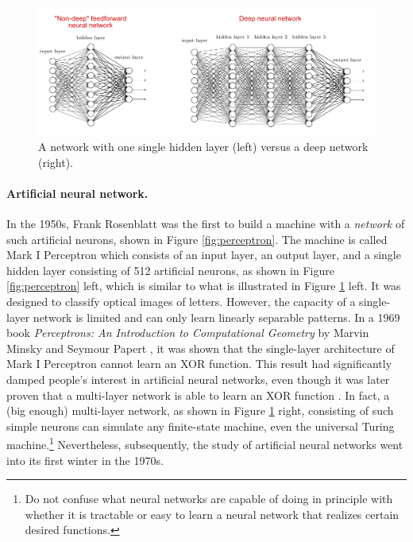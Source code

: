 \documentclass[../../book-main.tex]{subfiles}
\begin{document}
\begin{figure}[t]
\centering
\includegraphics[width=0.85\linewidth]{figures/single-deep.png}
    \caption{A network with one single hidden layer (left) versus a deep network (right).  }
    \label{fig:single-deep}
\end{figure}
\paragraph{Artificial neural network.}
In the 1950s, Frank Rosenblatt was the first to build a machine with a {\em network} of such artificial neurons, shown in Figure \ref{fig:perceptron}. The machine is called Mark I Perceptron which consists of an input layer, an output layer, and a single hidden layer consisting of 512 artificial neurons, as shown in Figure \ref{fig:perceptron} left,  which is similar to what is illustrated in Figure \ref{fig:single-deep} left. It was designed to classify optical images of letters. However, the capacity of a single-layer network is limited and can only learn linearly separable patterns. In a 1969 book {\em Perceptrons: An Introduction to Computational Geometry} by Marvin Minsky and Seymour Papert \cite{Minsky-1969}, it was shown that the single-layer architecture of Mark I Perceptron cannot learn an XOR function. This result had significantly damped people's interest in artificial neural networks, even though it was later proven that a multi-layer network is able to learn an XOR function \cite{Rumelhart1986}. In fact, a (big enough) multi-layer network, as shown in Figure \ref{fig:single-deep} right,  consisting of such simple neurons can simulate any finite-state machine, even the universal Turing machine.\footnote{Do not confuse what neural networks are  capable of doing in principle with whether it is tractable or easy to learn a neural network that realizes certain desired functions.}  Nevertheless, subsequently, the study of artificial neural networks went into its first winter in the 1970s.
\end{document}
